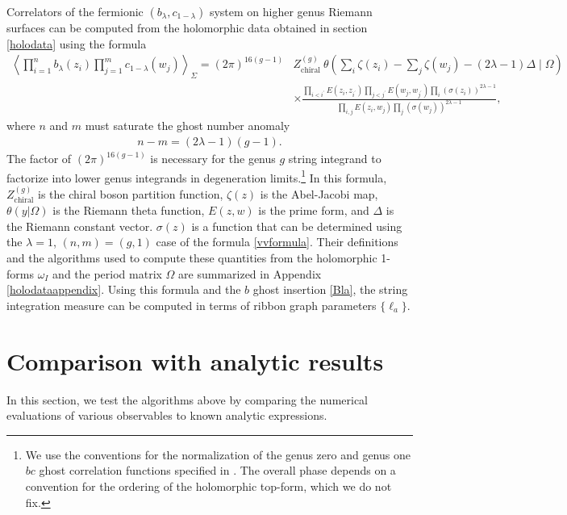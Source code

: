 \documentclass[12pt]{article}
\def\ie{\begin{equation}\begin{aligned}}
\def\fe{\end{aligned}\end{equation}}
\numberwithin{equation}{section}
\begin{document}
Correlators of the fermionic $(b_\lambda, c_{1-\lambda})$ system on higher genus Riemann surfaces can be computed from the holomorphic data obtained in section \ref{holodata} using the formula\cite{Verlinde:1986kw}
\ie \label{vvformula}
\left\langle\prod_{i=1}^n b_\lambda\left(z_i\right) \prod_{j=1}^m c_{1-\lambda}\left(w_j\right)\right\rangle_{\Sigma}=(2\pi)^{16(g-1)}  & Z_\text{chiral}^{(g)}\ \theta\left(\sum_i \zeta\left(z_i\right)-\sum_j \zeta\left(w_j\right)-(2 \lambda-1) \Delta \mid \Omega\right) \\
& \times \frac{\prod_{i<i^{\prime}} E\left(z_i, z_{i^{\prime}}\right) \prod_{j<j^{\prime}} E\left(w_j, w_{j^{\prime}}\right) \prod_i\left(\sigma\left(z_i\right)\right)^{2 \lambda-1}}{\prod_{i, j} E\left(z_i, w_j\right) \prod_j\left(\sigma\left(w_j\right)\right)^{2 \lambda-1}},
\fe 
where $n$ and $m$ must saturate the ghost number anomaly 
\ie \label{selection}
n-m=(2\lambda-1)(g-1).
\fe  
The factor of $(2\pi)^{16(g-1)}$ is necessary for the genus $g$ string integrand to factorize into lower genus integrands in degeneration limits.\footnote{We use the conventions for the normalization of the genus zero and genus one $bc$ ghost correlation functions specified in \cite{StringNotes}. The overall phase depends on a convention for the ordering of the holomorphic top-form, which we do not fix. } In this formula, $Z_{\text{chiral}}^{(g)}$ is the chiral boson partition function, $\zeta(z)$ is the Abel-Jacobi map, $\theta(y|\Omega)$ is the Riemann theta function, $E(z,w)$ is the prime form, and $\Delta$ is the Riemann constant vector. $\sigma(z)$ is a function that can be determined using the $\lambda = 1$, $(n,m)=(g,1)$ case of the formula \eqref{vvformula}. Their definitions and the algorithms used to compute these quantities from the holomorphic 1-forms $\omega_I$ and the period matrix $\Omega$ are summarized in Appendix \ref{holodataappendix}. Using this formula and the $b$ ghost insertion \eqref{Bla}, the string integration measure can be computed in terms of ribbon graph parameters $\{\ell_a\}$.

\section{Comparison with analytic results}

\label{numericssection}

In this section, we test the algorithms above by comparing the numerical evaluations of various observables to known analytic expressions.
 
\end{document}
